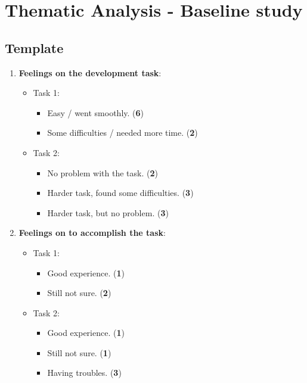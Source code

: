 \chapter{Thematic Analysis - Baseline study}
\label{appendix:D_Thematic_Analysis_Baseline}
\section{Template}
\begin{enumerate}
    \item \textbf{Feelings on the development task}:
    \begin{itemize}
        \item Task 1:
        \begin{itemize}
            \item Easy / went smoothly. (\textbf{6})
            \item Some difficulties / needed more time. (\textbf{2})
        \end{itemize}

        \item Task 2:
        \begin{itemize}
            \item No problem with the task. (\textbf{2})
            \item Harder task, found some difficulties. (\textbf{3})
            \item Harder task, but no problem. (\textbf{3})
        \end{itemize}
    \end{itemize}

    \item \textbf{Feelings on \tdd to accomplish the task}:
    \begin{itemize}
        \item Task 1:
        \begin{itemize}
            \item Good experience. (\textbf{1})
            \item Still not sure. (\textbf{2})
        \end{itemize}

        \item Task 2:
        \begin{itemize}
            \item Good experience. (\textbf{1})
            \item Still not sure. (\textbf{1})
            \item Having troubles. (\textbf{3})
        \end{itemize}
    \end{itemize}
    

\end{enumerate}
